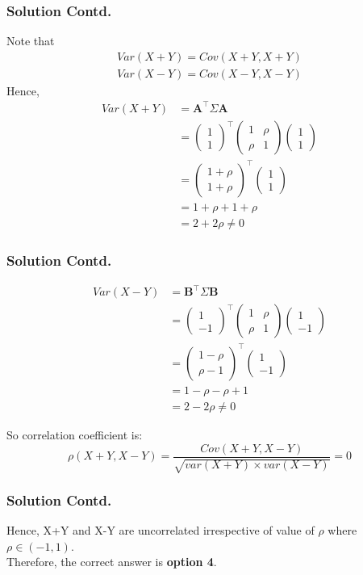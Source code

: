 \documentclass{beamer}
\renewcommand{\vec}[1]{\mathbf{#1}}
\newcommand{\myvec}[1]{\ensuremath{\begin{pmatrix}#1\end{pmatrix}}}
\providecommand{\brak}[1]{\ensuremath{\left(#1\right)}}
\begin{document}
\begin{frame}
  \frametitle{Solution Contd.} 
      Note that 
    \begin{align}
    Var(X+Y) = Cov(X+Y , X+Y)\\ 
     Var(X-Y)  = Cov(X-Y , X-Y)
    \end{align}
    Hence,
    \begin{align}
        Var(X+Y) &=\vec{A^\top} \Sigma \vec{A} \\
            &= \myvec{1 \\ 1}^\top
             \begin{pmatrix}
                1 & \rho\\
                \rho & 1 
            \end{pmatrix}
            \myvec{1 \\ 1}\\
        &= \myvec{1+\rho \\ 1+\rho}^\top
            \myvec{1 \\ 1}\\
        &= 1+\rho+1+\rho \\
        &= 2+2\rho \neq 0
    \end{align}
\end{frame}

    \begin{frame}
      \frametitle{Solution Contd.}
      \begin{align}
        Var(X-Y) &= \vec{B^\top} \Sigma \vec{B} \\
            &= \myvec{1 \\ -1}^\top
        \begin{pmatrix}
                1 & \rho\\
                \rho & 1 
            \end{pmatrix}
             \myvec{1 \\ -1}\\
        &= \myvec{1-\rho \\ \rho-1}^\top
            \myvec{1 \\ -1}\\
        &= 1-\rho-\rho+1 \\
        &= 2-2\rho \neq 0
    \end{align}
    
    So correlation coefficient is:
    \begin{equation}
        \rho(X+Y,X-Y) = \frac{Cov(X+Y,X-Y)}{\sqrt{var(X+Y) \times var(X-Y)}}
        = 0
    \end{equation}
\end{frame}

 \begin{frame}
  \frametitle{Solution Contd.} 
   Hence, X+Y and X-Y are uncorrelated irrespective of value of $\rho$ where $\rho \in \brak{-1,1}$.\\
    Therefore, the correct answer is \textbf{option 4}.
\end{frame}
\end{document}
